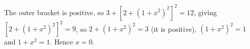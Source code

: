 The outer bracket is positive, so $3+\left[2+(1+x^2)^2\right]^2=12$, giving $\left[2+(1+x^2)^2\right]^2=9$, so $2+(1+x^2)^2=3$ (it is positive), $(1+x^2)^2=1$ and $1+x^2=1$. Hence $x=\boxed{0}$.
